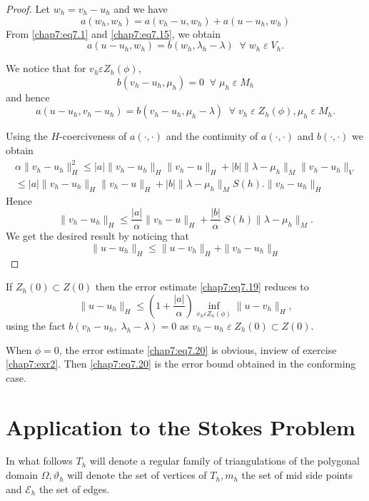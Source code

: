 \begin{proof}
Let $w_h=v_h-u_h$ and we have 
$$
a(w_h,w_h)=a(v_h-u,w_h)+a(u-u_h,w_h)
$$
From \eqref{chap7:eq7.1} and \eqref{chap7:eq7.15}, we obtain
$$
a(u-u_h,w_h)=b(w_h,\lambda_h-\lambda)\; \; \forall\;w_h\;\varepsilon
\;V_h.
$$

We notice that for $v_h\varepsilon Z_h(\phi)$, 
$$
b(v_h-u_h,\mu_h)=0\; \; \forall\;\mu_h\;\varepsilon\;M_h
$$
and hence
$$
a(u-u_h,v_h-u_h)=b(v_h-u_h,\mu_h-\lambda)\; \; \forall\;v_h\;\varepsilon\;
Z_h(\phi),\mu_h\;\varepsilon\;M_h.
$$

Using the $H$-coerciveness of $a(\cdotp,\cdotp)$ and the continuity of
$a(\cdotp,\cdotp)$ and $b(\cdotp,\cdotp)$ we obtain
\begin{align*}
\alpha\parallel v_h-u_h\parallel_H^2\leq|a|\parallel
v_h-u_h\parallel_H\parallel v_h-u\parallel_H+|b|\parallel\lambda-\mu_h
\parallel_M \parallel v_h-u_h\parallel_V\\
\leq|a|\parallel v_h-u_h\parallel_H\parallel v_h-u\parallel_H+|b|
\parallel\lambda-\mu_h\parallel_MS(h).\parallel v_h-u_h \parallel_H 
\end{align*}\pageoriginale
Hence 
$$
\parallel v_h-u_h\parallel_H\leq\frac{|a|}{\alpha}\parallel v_h-u
\parallel_H+\frac{|b|}{\alpha}\;S(h)\parallel\lambda-\mu_h\parallel_M. 
$$
We get the desired result by noticing that 
$$
\parallel u-u_h\parallel_H\leq\parallel u-v_h\parallel_H+\parallel
v_h-u_h\parallel_H
$$
\end{proof}

\begin{REM}\label{chap7:rem4}
If $Z_h(0)\subset Z(0)$ then the error estimate \eqref{chap7:eq7.19}
reduces to 
\begin{equation}\label{chap7:eq7.20}
\parallel u-u_h\parallel_H\leq\left(1+\frac{|a|}{\alpha}\right)
\inf\limits_{v_h\varepsilon Z_h(\phi)}\parallel u-v_h\parallel_H,
\end{equation}
using the fact $b(v_h-u_h,\;\lambda_h-\lambda)=0$ as
$v_h-u_h\;\varepsilon \;Z_h(0)\subset Z(0)$. 

When $\phi=0$, the error estimate \eqref{chap7:eq7.20} is obvious,
inview of exercise \ref{chap7:exr2}. Then \eqref{chap7:eq7.20} is the
error bound obtained in the conforming case.
\end{REM}

\section{Application to the Stokes  Problem} \label{chap7:ssec7.3}
 In what follows $T_h$ will denote a
regular family of triangulations of the polygonal domain
$\Omega,\vartheta_h$ will denote the set of vertices of $T_h, m_h$ the
set of mid side points and $\mathscr{E}_h$ the set of edges.

